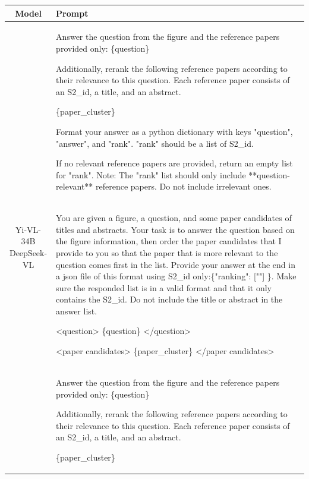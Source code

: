 \begin{table}[!t]
\centering
\small
\renewcommand\tabcolsep{1.0pt} %
\begin{tabular}{cp{11.5cm}}
    \toprule
    \textbf{Model} & \textbf{Prompt} \\
    \midrule
    \multirow{3}{*}{\parbox{4cm}{\centering Yi-VL-34B\\DeepSeek-VL}}
    &  Answer the question from the figure and the reference papers provided only: \{question\}
    
    Additionally, rerank the following reference papers according to their relevance to this question. Each reference paper consists of an S2\_id, a title, and an abstract.
    
    \{paper\_cluster\}
    
    Format your answer as a python dictionary with keys "question", "answer", and "rank". "rank" should be a list of S2\_id. 
    
    If no relevant reference papers are provided, return an empty list for "rank". Note: The "rank" list should only include **question-relevant** reference papers. Do not include irrelevant ones.\\
    \midrule
    \multirow{3}{*}{\parbox{4cm}{\centering InternVL-Chat-1.1V}}
    &  You are given a figure, a question, and some paper candidates of titles and abstracts. Your task is to answer the question based on the figure information, then order the paper candidates that I provide to you so that the paper that is more relevant to the question comes first in the list.
    Provide your answer at the end in a json file of this format using S2\_id only:\{"ranking":  [""] \}. Make sure the responded list is in a valid format and that it only contains the S2\_id. Do not include the title or abstract in the answer list. 

    <question>
    \{question\}
    </question>

    <paper candidates>
    \{paper\_cluster\}
    </paper candidates>\\
    \midrule
    \multirow{3}{*}{\parbox{4cm}{\centering LLaVa-1.6\\Qwen-VL}}
    & Answer the question from the figure and the reference papers provided only: \{question\}
    
    Additionally, rerank the following reference papers according to their relevance to this question. Each reference paper consists of an S2\_id, a title, and an abstract.
    
    \{paper\_cluster\}
    

\end{tabular}
\end{table}
